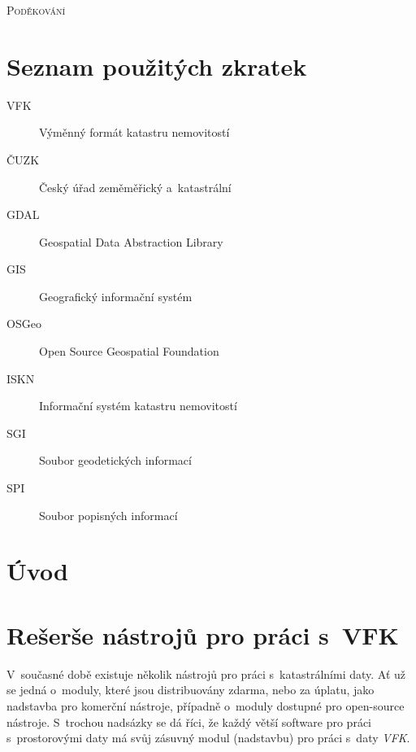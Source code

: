 \documentclass[a4paper,12pt,oneside]{book}
\begin{document}
\noindent
\textsc{\Large Poděkování}

\vspace{12pt}

\vspace{2cm}

\clearpage
\chapter*{Seznam použitých zkratek}
\thispagestyle{empty}

\begin{description}
\item[VFK] Výměnný formát katastru nemovitostí
\item[ČUZK] Český úřad zeměměřický a~katastrální
\item[GDAL] Geospatial Data Abstraction Library
\item[GIS] Geografický informační systém
\item[OSGeo] Open Source Geospatial Foundation
\item[ISKN] Informační systém katastru nemovitostí
\item[SGI] Soubor geodetických informací
\item[SPI] Soubor popisných informací
\end{description}


\clearpage
\rhead{{\rightmark}}		%
\tableofcontents
\thispagestyle{empty}

\clearpage
\pagestyle{fancy}		%
\setcounter{page}{1}   	%
\chapter*{Úvod}



\clearpage
\rhead{{\rightmark}}
\chapter{Rešerše nástrojů pro práci s~VFK}

V~současné době existuje několik nástrojů pro práci s~katastrálními daty. Ať už se jedná o~moduly, které jsou distribuovány zdarma, nebo za úplatu,  jako nadstavba pro komerční nástroje, případně o~moduly dostupné pro open-source nástroje. S~trochou nadsázky se dá říci, že každý větší software pro práci s~prostorovými daty má svůj zásuvný modul (nadstavbu) pro práci s~daty \textit{VFK}.
\end{document}
